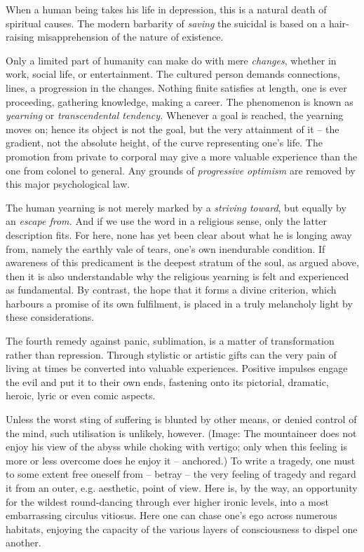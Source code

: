 \documentclass[draft,a4paper,10pt,twocolumn]{article}
\begin{document}
When a human being takes his life in depression, this is a natural death of spiritual causes. The modern barbarity of \emph{saving} the suicidal is based on a hair-raising misapprehension of the nature of existence.

Only a limited part of humanity can make do with mere \emph{changes}, whether in work, social life, or entertainment. The cultured person demands connections, lines, a progression in the changes. Nothing finite satisfies at length, one is ever proceeding, gathering knowledge, making a career. The phenomenon is known as \emph{yearning} or \emph{transcendental tendency.} Whenever a goal is reached, the yearning moves on; hence its object is not the goal, but the very attainment of it -- the gradient, not the absolute height, of the curve representing one's life. The promotion from private to corporal may give a more valuable experience than the one from colonel to general. Any grounds of \emph{progressive optimism} are removed by this major psychological law.

The human yearning is not merely marked by a \emph{striving toward}, but equally by an \emph{escape from.} And if we use the word in a religious sense, only the latter description fits. For here, none has yet been clear about what he is longing away from, namely the earthly vale of tears, one's own inendurable condition. If awareness of this predicament is the deepest stratum of the soul, as argued above, then it is also understandable why the religious yearning is felt and experienced as fundamental. By contrast, the hope that it forms a divine criterion, which harbours a promise of its own fulfilment, is placed in a truly melancholy light by these considerations.

The fourth remedy against panic, sublimation, is a matter of transformation rather than repression. Through stylistic or artistic gifts can the very pain of living at times be converted into valuable experiences. Positive impulses engage the evil and put it to their own ends, fastening onto its pictorial, dramatic, heroic, lyric or even comic aspects.

Unless the worst sting of suffering is blunted by other means, or denied control of the mind, such utilisation is unlikely, however. (Image: The mountaineer does not enjoy his view of the abyss while choking with vertigo; only when this feeling is more or less overcome does he enjoy it -- anchored.) To write a tragedy, one must to some extent free oneself from -- betray -- the very feeling of tragedy and regard it from an outer, e.g. aesthetic, point of view. Here is, by the way, an opportunity for the wildest round-dancing through ever higher ironic levels, into a most embarrassing circulus vitiosus. Here one can chase one's ego across numerous habitats, enjoying the capacity of the various layers of consciousness to dispel one another.
\end{document}

